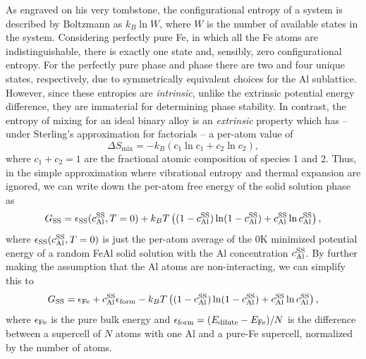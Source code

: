 As engraved on his very tombstone, the configurational entropy of a system is described by Boltzmann as $k_{B} \ln W$, where $W$ is the number of available states in the system.
Considering perfectly pure Fe, in which all the Fe atoms are indistinguishable, there is exactly one state and, sensibly, zero configurational entropy.
For the perfectly pure \BTWO phase and \DOTHREE phase there are two and four unique states, respectively, due to symmetrically equivalent choices for the Al sublattice.
However, since these entropies are \emph{intrinsic}, unlike the extrinsic potential energy difference, they are immaterial for determining phase stability.
In contrast, the entropy of mixing for an ideal binary alloy is an \emph{extrinsic} property which has -- under Sterling's approximation for factorials -- a per-atom value of
%
\begin{equation}
    \label{eq:mixing}
    \Delta S_{\mathrm{mix}} = -k_B \left(c_1 \ln c_1 + c_2 \ln c_2 \right),
\end{equation}
%
where $c_1 + c_2 = 1$ are the fractional atomic composition of species 1 and 2.
Thus, in the simple approximation where vibrational entropy and thermal expansion are ignored, we can write down the per-atom free energy of the solid solution phase as
%
\begin{equation}
    \label{eq:ss_simple}
    G_{\mathrm{SS}} = \epsilon_{\mathrm{SS}}(c_{\mathrm{Al}}^{\mathrm{SS}}, T=0) + k_B T \left( (1-c_{\mathrm{Al}}^{\mathrm{SS}})\ln(1 - c_{\mathrm{Al}}^{\mathrm{SS}}) + c_{\mathrm{Al}}^{\mathrm{SS}}\ln c_{\mathrm{Al}}^{\mathrm{SS}} \right),
\end{equation}
%
where $\epsilon_{\mathrm{SS}}(c_{\mathrm{Al}}^{\mathrm{SS}}, T=0)$ is just the per-atom average of the 0K minimized potential energy of a random FeAl solid solution with the Al concentration $c_{\mathrm{Al}}^{\mathrm{SS}}$.
By further making the assumption that the Al atoms are non-interacting, we can simplify this to
\begin{equation}
    \label{eq:ss_super_simple}
    G_{\mathrm{SS}} = \epsilon_{\mathrm{Fe}} + c_{\mathrm{Al}}^{\mathrm{SS}} \epsilon_{\mathrm{form}} -k_B T \left( (1-c_{\mathrm{Al}}^{\mathrm{SS}})\ln(1 - c_{\mathrm{Al}}^{\mathrm{SS}}) + c_{\mathrm{Al}}^{\mathrm{SS}}\ln c_{\mathrm{Al}}^{\mathrm{SS}} \right),
\end{equation}
%
where $\epsilon_{\mathrm{Fe}}$ is the pure bulk energy and $\epsilon_{\mathrm{form}} = (E_{\mathrm{dilute}} - E_{\mathrm{Fe}}) / N$ is the difference between a supercell of $N$ atoms with one Al and a pure-Fe supercell, normalized by the number of atoms.

